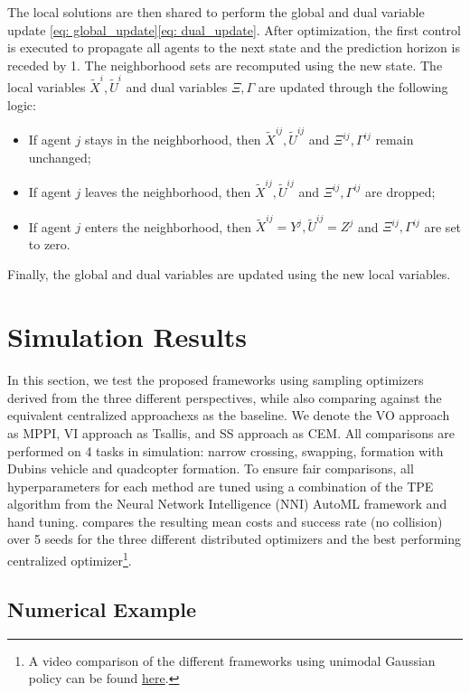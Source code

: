 \documentclass[twoside,11pt]{article}
\begin{document}
The local solutions are then shared to perform the global and dual variable update \eqref{eq: global_update}\eqref{eq: dual_update}. After optimization, the first control is executed to propagate all agents to the next state and the prediction horizon is receded by 1. The neighborhood sets are recomputed using the new state. The local variables $\tilde{X}^i, \tilde{U}^i$ and dual variables $\Xi, \Gamma$ are updated through the following logic:
\begin{itemize}
\item If agent $j$ stays in the neighborhood, then $\tilde{X}^{ij}, \tilde{U}^{ij}$ and $\Xi^{ij}, \Gamma^{ij}$ remain unchanged;
\item If agent $j$ leaves the neighborhood, then $\tilde{X}^{ij}, \tilde{U}^{ij}$ and $\Xi^{ij}, \Gamma^{ij}$ are dropped;
\item If agent $j$ enters the neighborhood, then $\tilde{X}^{ij}=Y^j, \tilde{U}^{ij}=Z^j$ and $\Xi^{ij}, \Gamma^{ij}$ are set to zero.
\end{itemize}
Finally, the global and dual variables are updated using the new local variables.

\section{Simulation Results}
\label{sec: results}



In this section, we test the proposed frameworks using sampling optimizers derived from the three different perspectives, while also comparing against the equivalent centralized approachexs as the baseline. We denote the \ac{VO} approach as \ac{MPPI}, \ac{VI} approach as Tsallis, and \ac{SS} approach as \ac{CEM}. All comparisons are performed on 4 tasks in simulation: narrow crossing, swapping, formation with Dubins vehicle and quadcopter formation. To ensure fair comparisons, all hyperparameters for each method are tuned using a combination of the TPE algorithm \citep{bergstra2011algorithms} from the Neural Network Intelligence (NNI) AutoML framework \citep{Microsoft_Neural_Network_Intelligence_2021} and hand tuning.  compares the resulting mean costs and success rate (no collision) over 5 seeds for the three different distributed optimizers and the best performing centralized optimizer\footnote{A video comparison of the different frameworks using unimodal Gaussian policy can be found \href{https://youtu.be/XHDJhNDqwtU}{here}.}.

\subsection{Numerical Example}
\end{document}
